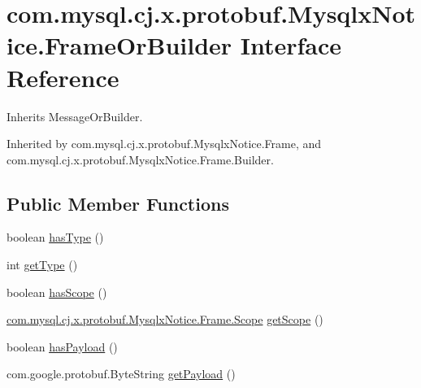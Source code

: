 \hypertarget{interfacecom_1_1mysql_1_1cj_1_1x_1_1protobuf_1_1_mysqlx_notice_1_1_frame_or_builder}{}\section{com.\+mysql.\+cj.\+x.\+protobuf.\+Mysqlx\+Notice.\+Frame\+Or\+Builder Interface Reference}
\label{interfacecom_1_1mysql_1_1cj_1_1x_1_1protobuf_1_1_mysqlx_notice_1_1_frame_or_builder}


Inherits Message\+Or\+Builder.



Inherited by com.\+mysql.\+cj.\+x.\+protobuf.\+Mysqlx\+Notice.\+Frame, and com.\+mysql.\+cj.\+x.\+protobuf.\+Mysqlx\+Notice.\+Frame.\+Builder.

\subsection*{Public Member Functions}
\begin{DoxyCompactItemize}
\item 
boolean \mbox{\hyperlink{interfacecom_1_1mysql_1_1cj_1_1x_1_1protobuf_1_1_mysqlx_notice_1_1_frame_or_builder_a7e4eaabcca9c9483a0200a69dab53527}{has\+Type}} ()
\item 
int \mbox{\hyperlink{interfacecom_1_1mysql_1_1cj_1_1x_1_1protobuf_1_1_mysqlx_notice_1_1_frame_or_builder_aabba99dd907ccf8e599247214e1218f5}{get\+Type}} ()
\item 
boolean \mbox{\hyperlink{interfacecom_1_1mysql_1_1cj_1_1x_1_1protobuf_1_1_mysqlx_notice_1_1_frame_or_builder_a396c92f0a2b31915276f008dfcf47c34}{has\+Scope}} ()
\item 
\mbox{\hyperlink{enumcom_1_1mysql_1_1cj_1_1x_1_1protobuf_1_1_mysqlx_notice_1_1_frame_1_1_scope}{com.\+mysql.\+cj.\+x.\+protobuf.\+Mysqlx\+Notice.\+Frame.\+Scope}} \mbox{\hyperlink{interfacecom_1_1mysql_1_1cj_1_1x_1_1protobuf_1_1_mysqlx_notice_1_1_frame_or_builder_a069abea01cec687e875a12085bd703d5}{get\+Scope}} ()
\item 
boolean \mbox{\hyperlink{interfacecom_1_1mysql_1_1cj_1_1x_1_1protobuf_1_1_mysqlx_notice_1_1_frame_or_builder_a33dd4e10babfc59333161a5c67cd3713}{has\+Payload}} ()
\item 
com.\+google.\+protobuf.\+Byte\+String \mbox{\hyperlink{interfacecom_1_1mysql_1_1cj_1_1x_1_1protobuf_1_1_mysqlx_notice_1_1_frame_or_builder_a9332a1765a3d78a522b0b9821acad3d9}{get\+Payload}} ()
\end{DoxyCompactItemize}


